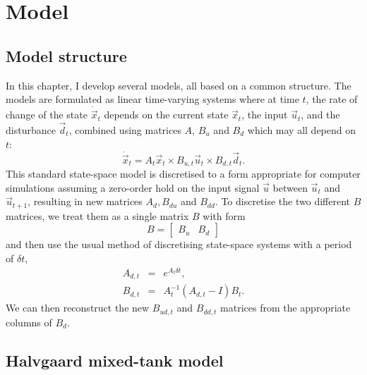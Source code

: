 \chapter{Model}

\section{Model structure}

In this chapter, I develop several models, all based on a common structure.
The models are formulated as linear time-varying systems where at time $t$, the rate of change of the state $\dot{\vec{x}}_t$ depends on the current state $\vec{x}_t$, the input $\vec{u}_t$, and the disturbance $\vec{d}_t$, combined using matrices $A$, $B_u$ and $B_d$ which may all depend on $t$:
\begin{equation}
	\dot{\vec{x}}_t = A_t \vec{x}_t \times B_{u, t} \vec{u}_t \times B_{d, t} \vec{d}_t.
	\label{eq:xdot}
\end{equation}
This standard state-space model is discretised to a form appropriate for computer simulations assuming a zero-order hold on the input signal $\vec{u}$ between $\vec{u}_t$ and $\vec{u}_{t+1}$, resulting in new matrices $A_d, B_{du}$ and $B_{dd}$.
To discretise the two different $B$ matrices, we treat them as a single matrix $B$ with form
\begin{displaymath}
	B = \left[\begin{array}{cc}
		B_u & B_d
	\end{array}\right]
\end{displaymath}
and then use the usual method of discretising state-space systems with a period of $\delta t$,
\begin{eqnarray}
	A_{d, t} &=& e^{A_t \delta t}, \\
	B_{d, t} &=& A_t^{-1} (A_{d, t} - I) B_t.
\end{eqnarray}
We can then reconstruct the new $B_{ud, t}$ and $B_{dd, t}$ matrices from the appropriate columns of $B_d$.

\section{Halvgaard mixed-tank model}
\label{sec:model:halvgaard}


